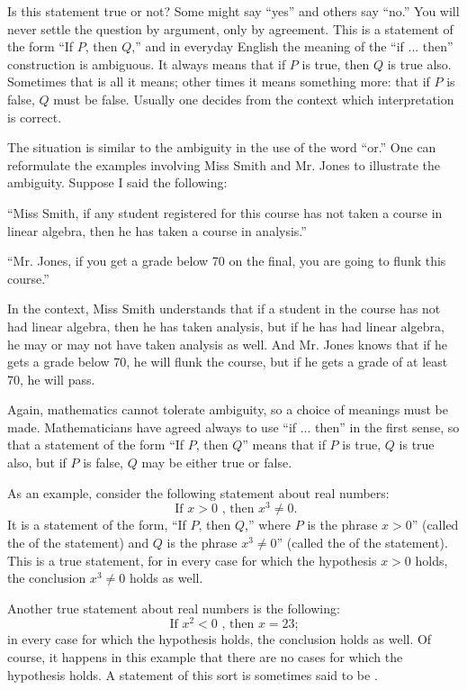 Is this statement true or not? Some might say ``yes'' and others say ``no.'' 
You will never settle the question by argument, only by agreement. 
This is a statement of the form ``If \(P\), then \(Q\),'' 
and in everyday English the meaning of the ``if ... then'' construction is ambiguous. 
It always means that if \(P\) is true, then \(Q\) is true also. 
Sometimes that is all it means; other times it means something more: 
that if \(P\) is false, \(Q\) must be false. 
Usually one decides from the context which interpretation is correct.

The situation is similar to the ambiguity in the use of the word ``or.'' 
One can reformulate the examples involving Miss Smith and Mr. Jones to 
illustrate the ambiguity. Suppose I said the following:

\begin{centeredblock}
 ``Miss Smith, if any student registered for this course has not taken a course 
 in linear algebra, then he has taken a course in analysis.''

 ``Mr. Jones, if you get a grade below 70 on the final, you are going to flunk this course.''
\end{centeredblock}
In the context, Miss Smith understands that if a student in the course has not had linear 
algebra, then he has taken analysis, but if he has had linear algebra, he may or may not 
have taken analysis as well. And Mr. Jones knows that if he gets a grade below 70, he 
will flunk the course, but if he gets a grade of at least 70, he will pass.

Again, mathematics cannot tolerate ambiguity, so a choice of meanings must be made. 
Mathematicians have agreed always to use ``if ... then'' in the first sense, so that 
a statement of the form ``If \(P\), then \(Q\)'' means that if \(P\) is true, \(Q\) 
is true also, but if \(P\) is false, \(Q\) may be either true or false.

As an example, consider the following statement about real numbers:
\[
\text{ If }x > 0\text{ , then }x^{3} \neq 0\text{.}
\]
It is a statement of the form, ``If \(P\), then \(Q\),'' where \(P\) is the 
phrase \(x > 0\)'' (called the  of the statement) and \(Q\) is the 
phrase \(x^{3} \neq 0\)'' (called the  of the statement). This 
is a true statement, for in every case for which the hypothesis \(x > 0\) holds, 
the conclusion \(x^{3} \neq 0\) holds as well.

Another true statement about real numbers is the following:
\[
\text{ If }x^{2} < 0\text{ , then }x = {23}\text{; }
\]
in every case for which the hypothesis holds, the conclusion holds as well. 
Of course, it happens in this example that there are no cases for which the 
hypothesis holds. A statement of this sort is sometimes said to be .

